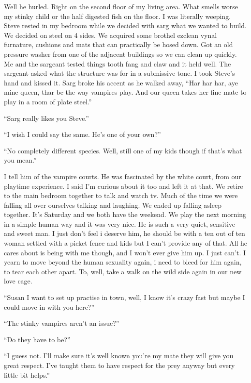 Well he hurled. Right on the second floor of my living area. What smells worse my stinky child or the half digested fish on the floor. I was literally weeping. Steve rested in my bedroom while we decided with sarg what we wanted to build. We decided on steel on 4 sides. We acquired some brothel ezclean vynal furnature, cushions and mats that can practically be hosed down. Got an old pressure washer from one of the adjacent buildings so we can clean up quickly. Me and the sargeant tested things tooth fang and claw and it held well. The sargeant asked what the structure was for in a submissive tone. I took Steve's hand and kissed it. Sarg broke his accent as he walked away, ``Har har har, aye mine queen, thar be the way vampires play. And our queen takes her fine mate to play in a room of plate steel.''

``Sarg really likes you Steve.''

``I wish I could say the same. He's one of your own?''

``No completely different species. Well, still one of my kids though if that's what you mean.''

I tell him of the vampire courts. He was fascinated by the white court, from our playtime experience. I said I'm curious about it too and left it at that. We retire to the main bedroom together to talk and watch tv. Much of the time we were falling all over ourselves talking and laughing. We ended up falling asleep together. It's Saturday and we both have the weekend. We play the next morning in a simple human way and it was very nice. He is such a very quiet, sensitive and sweet man. I just don't feel i deserve him, he should be with a ten out of ten woman settled with a picket fence and kids but I can't provide any of that. All he cares about is being with me though, and I won't ever give him up. I just can't. I yearn to move beyond the human sexuality again, i need to bleed for him again, to tear each other apart. To, well, take a walk on the wild side again in our new love cage.

``Susan I want to set up practise in town, well, I know it's crazy fast but maybe I could move in with you here?''

``The stinky vampires aren't an issue?''

``Do they have to be?''

``I guess not. I'll make sure it's well known you're my mate they will give you great respect. I've taught them to have respect for the prey anyway but every little bit helps.''

